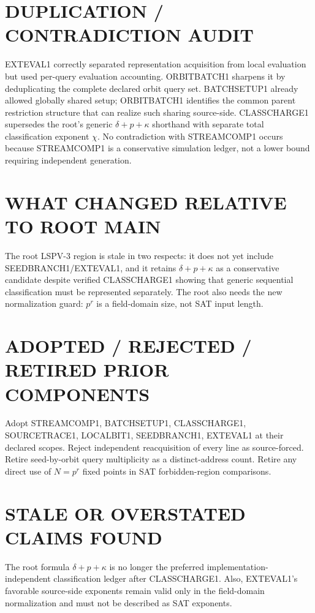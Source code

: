 \documentclass[11pt]{article}
\begin{document}
\section*{DUPLICATION / CONTRADICTION AUDIT}
EXTEVAL1 correctly separated representation acquisition from local evaluation but used per-query evaluation accounting. ORBITBATCH1 sharpens it by deduplicating the complete declared orbit query set. BATCHSETUP1 already allowed globally shared setup; ORBITBATCH1 identifies the common parent restriction structure that can realize such sharing source-side. CLASSCHARGE1 supersedes the root's generic \(\delta+p+\kappa\) shorthand with separate total classification exponent \(\chi\). No contradiction with STREAMCOMP1 occurs because STREAMCOMP1 is a conservative simulation ledger, not a lower bound requiring independent generation.

\section*{WHAT CHANGED RELATIVE TO ROOT MAIN}
The root LSPV-3 region is stale in two respects: it does not yet include SEEDBRANCH1/EXTEVAL1, and it retains \(\delta+p+\kappa\) as a conservative candidate despite verified CLASSCHARGE1 showing that generic sequential classification must be represented separately. The root also needs the new normalization guard: \(p^r\) is a field-domain size, not SAT input length.

\section*{ADOPTED / REJECTED / RETIRED PRIOR COMPONENTS}
Adopt STREAMCOMP1, BATCHSETUP1, CLASSCHARGE1, SOURCETRACE1, LOCALBIT1, SEEDBRANCH1, EXTEVAL1 at their declared scopes. Reject independent reacquisition of every line as source-forced. Retire seed-by-orbit query multiplicity as a distinct-address count. Retire any direct use of \(N=p^r\) fixed points in SAT forbidden-region comparisons.

\section*{STALE OR OVERSTATED CLAIMS FOUND}
The root formula \(\delta+p+\kappa\) is no longer the preferred implementation-independent classification ledger after CLASSCHARGE1. Also, EXTEVAL1's favorable source-side exponents remain valid only in the field-domain normalization and must not be described as SAT exponents.
\end{document}
